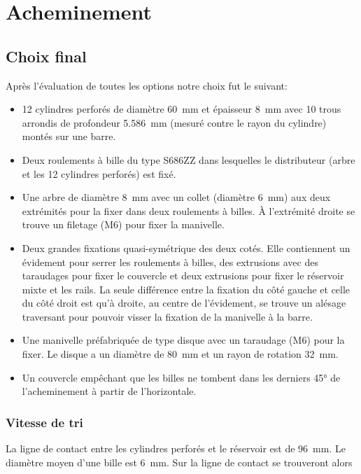 \section{Acheminement}
\subsection{Choix final}
Après l'évaluation de toutes les options notre choix fut le suivant:
\begin{itemize}
	\item \num{12} cylindres perforés de diamètre \SI{60}{\milli\metre} et épaisseur \SI{8}{\milli\metre} avec \num{10} trous arrondis de profondeur \SI{5.586}{\milli\metre} (mesuré contre le rayon du cylindre) montés sur une barre.
	\item Deux roulements à bille du type S686ZZ dans lesquelles le distributeur (arbre et les \num{12} cylindres perforés) est fixé.
	\item Une arbre de diamètre \SI{8}{\milli\metre} avec un collet (diamètre \SI{6}{\milli\metre}) aux deux extrémités pour la fixer dans deux roulements à billes. À l'extrémité droite se trouve un filetage (M6) pour fixer la manivelle.
	\item Deux grandes fixations quasi-symétrique des deux cotés. Elle contiennent un évidement pour serrer les roulements à billes, des extrusions avec des taraudages pour fixer le couvercle et deux extrusions pour fixer le réservoir mixte et les rails. La seule différence entre la fixation du côté gauche et celle du côté droit est qu'à droite, au centre de l'évidement, se trouve un alésage traversant pour pouvoir visser la fixation de la manivelle à la barre.
	\item Une manivelle préfabriquée de type disque avec un taraudage (M6) pour la fixer. Le disque a un diamètre de \SI{80}{\milli\metre} et un rayon de rotation  \SI{32}{\milli\metre}.
	\item Un couvercle empêchant que les billes ne tombent dans les derniers \ang{45} de l'acheminement à partir de l'horizontale.
\end{itemize}


\subsubsection{Vitesse de tri}
La ligne de contact entre les cylindres perforés et le réservoir est de \SI{96}{\milli\metre}. Le diamètre moyen d'une bille est \SI{6}{\milli\metre}. Sur la ligne de contact se trouveront alors

